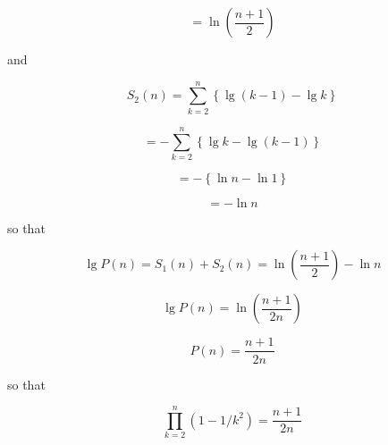 \documentclass[a4paper,12pt]{article}
\begin{document}
\[ = \ln\left(\frac{n+1}{2}\right) \]

and

\[ S_2(n) = \sum_{k=2}^n \left\{\lg(k-1) - \lg k \right\} \]

\[ = - \sum_{k=2}^n \left\{\lg k - \lg(k-1) \right\} \]

\[ = -\left\{\ln n - \ln 1\right\}\]

\[ = -\ln n \]

so that

\[ \lg P(n) = S_1(n) + S_2(n) = \ln \left(\frac{n+1}{2}\right) - \ln n \]

\[ \lg P(n) = \ln \left(\frac{n+1}{2n} \right) \]

\[ P(n) = \frac{n+1}{2n} \]

so that

\[ \prod_{k=2}^n \left(1 - 1/k^2\right) = \frac{n+1}{2n}\]
\end{document}
